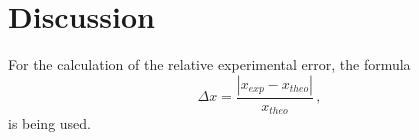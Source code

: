 \section{Discussion}
\label{sec:Discussion}

For the calculation of the relative experimental error, the formula
\begin{equation}
    \Delta x =   \frac{ \left| x_{exp} - x_{theo} \right|   }{x_{theo}} \, ,
    \label{eq:abweichung}
\end{equation}
is being used.

\clearpage